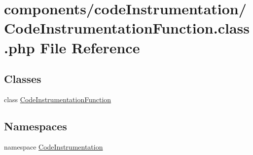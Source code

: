\hypertarget{_code_instrumentation_function_8class_8php}{
\section{components/codeInstrumentation/CodeInstrumentationFunction.class.php File Reference}
\label{_code_instrumentation_function_8class_8php}
}
\subsection*{Classes}
\begin{CompactItemize}
\item 
class \hyperlink{class_code_instrumentation_function}{CodeInstrumentationFunction}
\end{CompactItemize}
\subsection*{Namespaces}
\begin{CompactItemize}
\item 
namespace \hyperlink{namespace_code_instrumentation}{CodeInstrumentation}
\end{CompactItemize}
